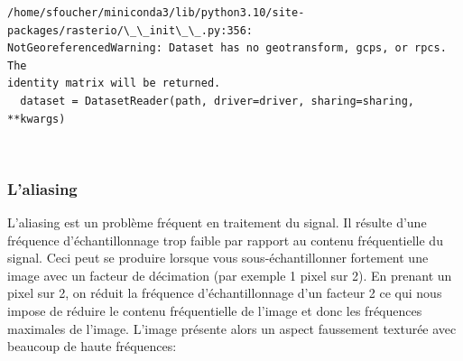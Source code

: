 \documentclass[11pt]{article}
\begin{document}
    \begin{Verbatim}[commandchars=\\\{\}]
/home/sfoucher/miniconda3/lib/python3.10/site-packages/rasterio/\_\_init\_\_.py:356:
NotGeoreferencedWarning: Dataset has no geotransform, gcps, or rpcs. The
identity matrix will be returned.
  dataset = DatasetReader(path, driver=driver, sharing=sharing, **kwargs)
    \end{Verbatim}

    \begin{center}
    \end{center}
    { \hspace*{\fill} \\}
    
    \hypertarget{laliasing}{%
\subsubsection{L'aliasing}\label{laliasing}}

L'aliasing est un problème fréquent en traitement du signal. Il résulte
d'une fréquence d'échantillonnage trop faible par rapport au contenu
fréquentielle du signal. Ceci peut se produire lorsque vous
sous-échantillonner fortement une image avec un facteur de décimation
(par exemple 1 pixel sur 2). En prenant un pixel sur 2, on réduit la
fréquence d'échantillonnage d'un facteur 2 ce qui nous impose de réduire
le contenu fréquentielle de l'image et donc les fréquences maximales de
l'image. L'image présente alors un aspect faussement texturée avec
beaucoup de haute fréquences:
\end{document}
